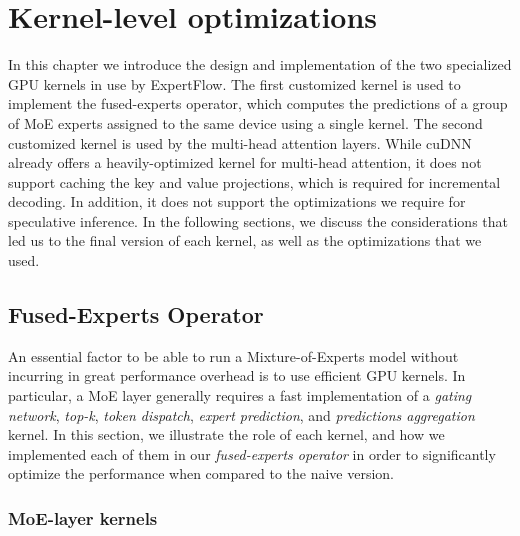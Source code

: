 
\chapter{Kernel-level optimizations}\label{chapter-6}
In this chapter we introduce the design and implementation of the two specialized GPU kernels in use by ExpertFlow. The first customized kernel is used to implement the fused-experts operator, which computes the predictions of a group of MoE experts assigned to the same device using a single kernel. The second customized kernel is used by the multi-head attention layers. While cuDNN already offers a heavily-optimized kernel for multi-head attention, it does not support caching the key and value projections, which is required for incremental decoding. In addition, it does not support the optimizations we require for speculative inference. In the following sections, we discuss the considerations that led us to the final version of each kernel, as well as the optimizations that we used. 

\section{Fused-Experts Operator}\label{section-fused-experts}
An essential factor to be able to run a Mixture-of-Experts model without incurring in great performance overhead is to use efficient GPU kernels. In particular, a MoE layer generally requires a fast implementation of a \textit{gating network}, \textit{top-k}, \textit{token dispatch}, \textit{expert prediction}, and \textit{predictions aggregation} kernel. In this section, we illustrate the role of each kernel, and how we implemented each of them in our \textit{fused-experts operator} in order to significantly optimize the performance when compared to the naive version.

\subsection{MoE-layer kernels}

